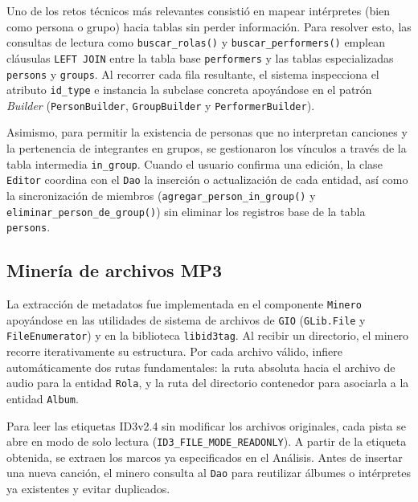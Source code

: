 \documentclass{rep}
\begin{document}
    Uno de los retos técnicos más relevantes consistió en mapear
    intérpretes (bien como persona o grupo) hacia tablas sin perder
    información. Para resolver esto, las consultas de lectura como
    \texttt{buscar\_rolas()} y \texttt{buscar\_performers()} emplean
    cláusulas \texttt{LEFT JOIN} entre la tabla base
    \texttt{performers} y las tablas especializadas \texttt{persons} y
    \texttt{groups}. Al recorrer cada fila resultante, el sistema
    inspecciona el atributo \texttt{id\_type} e instancia la subclase
    concreta apoyándose en el patrón \textit{Builder}
    (\texttt{PersonBuilder}, \texttt{GroupBuilder} y
    \texttt{PerformerBuilder}).

    Asimismo, para permitir la existencia de personas que no
    interpretan canciones y la pertenencia de integrantes en grupos,
    se gestionaron los vínculos a través de la tabla intermedia
    \texttt{in\_group}. Cuando el usuario confirma una edición, la
    clase \texttt{Editor} coordina con el \texttt{Dao} la inserción o
    actualización de cada entidad, así como la sincronización de
    miembros (\texttt{agregar\_person\_in\_group()} y
    \texttt{eliminar\_person\_de\_group()}) sin eliminar los registros
    base de la tabla \texttt{persons}.

    \subsection{Minería de archivos MP3}

    La extracción de metadatos fue implementada en el componente
    \texttt{Minero} apoyándose en las utilidades de sistema de
    archivos de \texttt{GIO} (\texttt{GLib.File} y
    \texttt{FileEnumerator}) y en la biblioteca \texttt{libid3tag}. Al
    recibir un directorio, el minero recorre iterativamente su
    estructura. Por cada archivo válido, infiere automáticamente dos
    rutas fundamentales: la ruta absoluta hacia el archivo de audio
    para la entidad \texttt{Rola}, y la ruta del directorio contenedor
    para asociarla a la entidad \texttt{Album}.

    Para leer las etiquetas ID3v2.4 sin modificar los archivos
    originales, cada pista se abre en modo de solo lectura
    (\texttt{ID3\_FILE\_MODE\_READONLY}). A partir de la etiqueta
    obtenida, se extraen los marcos ya especificados en el
    Análisis. Antes de insertar una nueva canción, el minero consulta
    al \texttt{Dao} para reutilizar álbumes o intérpretes ya
    existentes y evitar duplicados.
\end{document}
